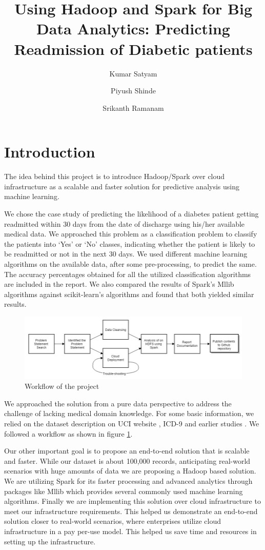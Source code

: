 \documentclass[9pt,twocolumn,twoside]{../../styles/osajnl}
\title{Using Hadoop and Spark for Big Data Analytics: Predicting Readmission of Diabetic patients}
\author[1,*]{Kumar Satyam}
\author[1,**]{Piyush Shinde}
\author[1,***]{Srikanth Ramanam}
\affil[1]{School of Informatics and Computing, Bloomington, IN 47408, U.S.A.}
\affil[*]{Corresponding authors: ksatyam@indiana.edu}
\affil[**]{Corresponding authors: pshinde@iu.edu}
\affil[***]{Corresponding authors: srikrama@iu.edu}
\begin{document}
\maketitle

\tableofcontents %

\section{Introduction}
The idea behind this project is to introduce Hadoop/Spark over cloud infrastructure as a scalable and faster solution for predictive analysis using machine learning.

We chose the case study of predicting the likelihood of a diabetes patient getting readmitted within 30 days from the date of discharge using his/her available medical data. We approached this problem as a classification problem to classify the patients into  ‘Yes’ or ‘No’  classes, indicating whether the patient is likely to be readmitted or not in the next 30 days. We used different machine learning algorithms on the available data, after some pre-processing, to predict the same. The accuracy percentages obtained for all the utilized classification algorithms are included in the report. We also compared the results of Spark's Mllib algorithms against scikit-learn's algorithms and found that both yielded similar results.	

\begin{figure}[h]\centering
\includegraphics[width=\linewidth]{images/Workflow}
\caption{Workflow of the project}
\label{fig:workflow}
\end{figure}

We approached the solution from a pure data perspective to address the challenge of lacking medical domain knowledge. For some basic information, we relied on the dataset description on UCI website \cite{www-dataset}, ICD-9 \cite{www-icd9} and earlier studies \cite{article-hindawi}. We followed a workflow as shown in figure \ref{fig:workflow}. 

Our other important goal is to propose an end-to-end solution that is scalable and faster. While our dataset is about 100,000 records, anticipating real-world scenarios with huge amounts of data we are proposing a Hadoop based solution. We are utilizing Spark for its faster processing \cite{www-sparkfast} and  advanced analytics through packages like Mllib \cite{www-mllib} which provides several commonly used machine learning algorithms. Finally we are implementing this solution over cloud infrastructure to meet our infrastructure requirements. This helped us demonstrate an end-to-end solution closer to real-world scenarios, where enterprises utilize cloud infrastructure in a pay per-use model. This helped us save time and resources in setting up the infrastructure.
\end{document}
